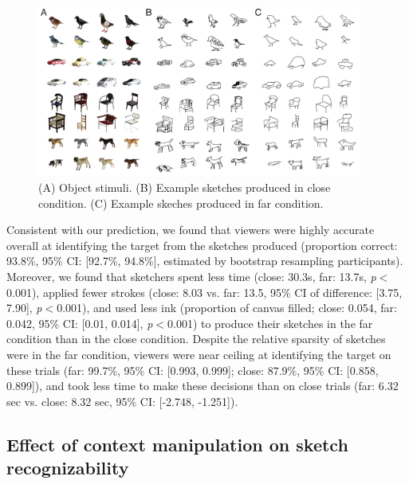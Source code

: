 \documentclass[9pt,twocolumn,twoside]{pnas-new}
\begin{document}

\begin{figure}[htbp]
\centering
\includegraphics[width=0.95\textwidth]{figures/2_sketch_gallery.pdf}
\caption{(A) Object stimuli. (B) Example sketches produced in close condition. (C) Example skeches produced in far condition.}
\label{sketch_gallery}
\end{figure}

Consistent with our prediction, we found that viewers were highly accurate overall at identifying the target from the sketches produced (proportion correct: 93.8\%, 95\% CI: [92.7\%, 94.8\%], estimated by bootstrap resampling participants). Moreover, we found that sketchers spent less time (close: 30.3s, far: 13.7s, \textit{p}$<$0.001), applied fewer strokes (close: 8.03 vs. far: 13.5, 95\% CI of difference: [3.75, 7.90], \textit{p}$<$0.001), and used less ink (proportion of canvas filled; close: 0.054, far: 0.042, 95\% CI: [0.01, 0.014], \textit{p}$<$0.001) to produce their sketches in the far condition than in the close condition. Despite the relative sparsity of sketches were in the far condition, viewers were near ceiling at identifying the target on these trials (far: 99.7\%, 95\% CI: [0.993, 0.999]; close: 87.9\%, 95\% CI: [0.858, 0.899]), and took less time to make these decisions than on close trials (far: 6.32 sec vs. close: 8.32 sec, 95\% CI: [-2.748, -1.251]).

\subsection*{Effect of context manipulation on sketch recognizability}
\end{document}
